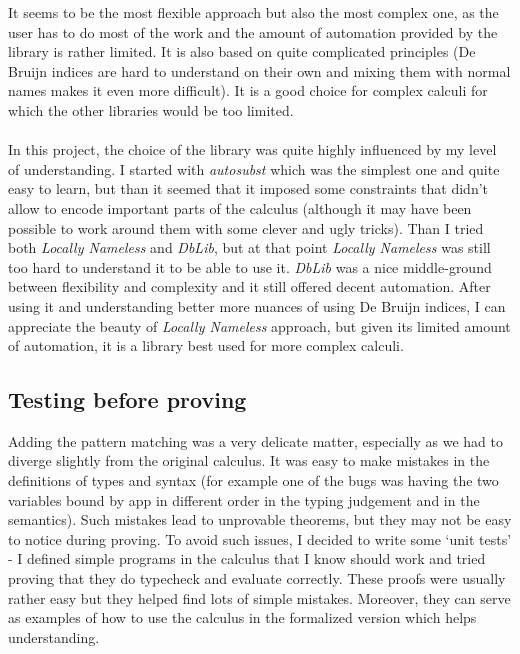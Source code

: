 \documentclass[runningheads]{article}
\begin{document}
It seems to be the most flexible approach but also the most complex one, as the user has to do most of the work and the amount of automation provided by the library is rather limited. It is also based on quite complicated principles (De Bruijn indices are hard to understand on their own and mixing them with normal names makes it even more difficult). It is a good choice for complex calculi for which the other libraries would be too limited.

\paragraph{}

In this project, the choice of the library was quite highly influenced by my level of understanding. I started with \textit{autosubst} which was the simplest one and quite easy to learn, but than it seemed that it imposed some constraints that didn't allow to encode important parts of the calculus (although it may have been possible to work around them with some clever and ugly tricks). Than I tried both \textit{Locally Nameless} and \textit{DbLib}, but at that point \textit{Locally Nameless} was still too hard to understand it to be able to use it. \textit{DbLib} was a nice middle-ground between flexibility and complexity and it still offered decent automation. After using it and understanding better more nuances of using De Bruijn indices, I can appreciate the beauty of \textit{Locally Nameless} approach, but given its limited amount of automation, it is a library best used for more complex calculi.

\subsection{Testing before proving}
Adding the pattern matching was a very delicate matter, especially as we had to diverge slightly from the original calculus. It was easy to make mistakes in the definitions of types and syntax (for example one of the bugs was having the two variables bound by app in different order in the typing judgement and in the semantics). Such mistakes lead to unprovable theorems, but they may not be easy to notice during proving. To avoid such issues, I decided to write some `unit tests' - I defined simple programs in the calculus that I know should work and tried proving that they do typecheck and evaluate correctly. These proofs were usually rather easy but they helped find lots of simple mistakes. Moreover, they can serve as examples of how to use the calculus in the formalized version which helps understanding.
\end{document}
